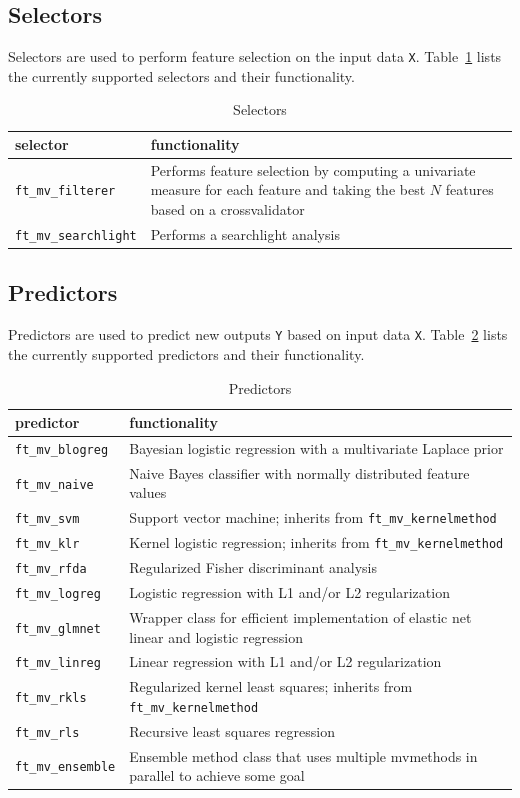 \documentclass{article}
\renewcommand{\t}[1]{{\tt #1}}
\begin{document}
\subsection{Selectors}

Selectors are used to perform feature selection on the input data \t{X}. Table~\ref{selectors} lists the currently supported selectors and their functionality.

\begin{table}[ht]
\centering
\caption{Selectors}
\begin{tabular}{p{}|p{}}
\bf{selector} & \bf{functionality}\\
\hline
\t{ft\_mv\_filterer} & Performs feature selection by computing a univariate measure for each feature and taking the best $N$ features based on a crossvalidator\\
\t{ft\_mv\_searchlight} & Performs a searchlight analysis
\end{tabular}
\label{selectors}
\end{table}

\subsection{Predictors}

Predictors are used to predict new outputs \t{Y} based on input data \t{X}. Table~\ref{predictors} lists the currently supported predictors and their functionality.

\begin{table}[ht]
\centering
\caption{Predictors}
\begin{tabular}{p{}|p{}}
\bf{predictor} & \bf{functionality}\\
\hline
\t{ft\_mv\_blogreg} & Bayesian logistic regression with a multivariate Laplace prior\\
\t{ft\_mv\_naive} & Naive Bayes classifier with normally distributed feature values\\
\t{ft\_mv\_svm} & Support vector machine; inherits from \t{ft\_mv\_kernelmethod}\\
\t{ft\_mv\_klr}  &  Kernel logistic regression;  inherits from \t{ft\_mv\_kernelmethod}\\
\t{ft\_mv\_rfda} & Regularized Fisher discriminant analysis\\
\t{ft\_mv\_logreg} & Logistic regression with L1 and/or L2 regularization\\
\t{ft\_mv\_glmnet} & Wrapper class for efficient implementation of elastic net linear and logistic regression\\
\t{ft\_mv\_linreg} & Linear regression with L1 and/or L2 regularization\\
\t{ft\_mv\_rkls} & Regularized kernel least squares; inherits from \t{ft\_mv\_kernelmethod}\\
\t{ft\_mv\_rls} & Recursive least squares regression\\
\t{ft\_mv\_ensemble} & Ensemble method class that uses multiple mvmethods in parallel to achieve some goal
\end{tabular}
\label{predictors}
\end{table}
\end{document}
